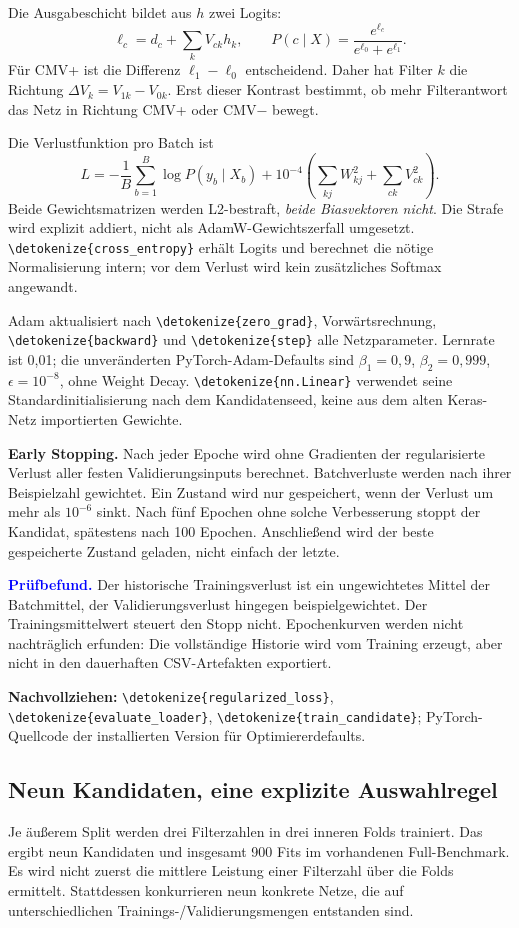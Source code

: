 \documentclass[11pt,a4paper]{article}
\newcommand{\code}[1]{\expandafter\nolinkurl\expandafter{\detokenize{#1}}}
\newcommand{\source}[1]{\par{\footnotesize\raggedright\color{muted}\textbf{Nachvollziehen:} #1\par}}
\newcommand{\finding}[1]{\par\smallskip\noindent\textcolor{blue}{\textbf{Prüfbefund.}} #1\par}
\begin{document}
Die Ausgabeschicht bildet aus \(h\) zwei Logits:
\[
 \ell_c=d_c+\sum_k V_{ck}h_k,\qquad
 P(c\mid X)=\frac{e^{\ell_c}}{e^{\ell_0}+e^{\ell_1}}.
\]
Für CMV+ ist die Differenz \(\ell_1-\ell_0\) entscheidend. Daher hat
Filter \(k\) die Richtung \(\Delta V_k=V_{1k}-V_{0k}\). Erst dieser
Kontrast bestimmt, ob mehr Filterantwort das Netz in Richtung CMV+ oder
CMV− bewegt.

Die Verlustfunktion pro Batch ist
\[
 L=-\frac1B\sum_{b=1}^B\log P(y_b\mid X_b)
   +10^{-4}\left(\sum_{kj}W_{kj}^2+\sum_{ck}V_{ck}^2\right).
\]
Beide Gewichtsmatrizen werden L2-bestraft, \emph{beide Biasvektoren nicht}.
Die Strafe wird explizit addiert, nicht als AdamW-Gewichtszerfall umgesetzt.
\code{cross_entropy} erhält Logits und berechnet die nötige Normalisierung
intern; vor dem Verlust wird kein zusätzliches Softmax angewandt.

Adam aktualisiert nach \code{zero_grad}, Vorwärtsrechnung,
\code{backward} und \code{step} alle Netzparameter. Lernrate ist 0,01;
die unveränderten PyTorch-Adam-Defaults sind \(\beta_1=0{,}9\),
\(\beta_2=0{,}999\), \(\epsilon=10^{-8}\), ohne Weight Decay.
\code{nn.Linear} verwendet seine Standardinitialisierung nach dem
Kandidatenseed, keine aus dem alten Keras-Netz importierten Gewichte.

\textbf{Early Stopping.} Nach jeder Epoche wird ohne Gradienten der
regularisierte Verlust aller festen Validierungsinputs berechnet.
Batchverluste werden nach ihrer Beispielzahl gewichtet. Ein Zustand wird
nur gespeichert, wenn der Verlust um mehr als \(10^{-6}\) sinkt.
Nach fünf Epochen ohne solche Verbesserung stoppt der Kandidat, spätestens
nach 100 Epochen. Anschließend wird der beste gespeicherte Zustand geladen,
nicht einfach der letzte.

\finding{Der historische Trainingsverlust ist ein ungewichtetes Mittel der
Batchmittel, der Validierungsverlust hingegen beispielgewichtet. Der
Trainingsmittelwert steuert den Stopp nicht. Epochenkurven werden nicht
nachträglich erfunden: Die vollständige Historie wird vom Training erzeugt,
aber nicht in den dauerhaften CSV-Artefakten exportiert.}
\source{\code{regularized_loss}, \code{evaluate_loader}, \code{train_candidate};
PyTorch-Quellcode der installierten Version für Optimiererdefaults.}

\clearpage
\subsection*{Neun Kandidaten, eine explizite Auswahlregel}
Je äußerem Split werden drei Filterzahlen in drei inneren Folds trainiert.
Das ergibt neun Kandidaten und insgesamt 900 Fits im vorhandenen
Full-Benchmark. Es wird nicht zuerst die mittlere Leistung einer Filterzahl
über die Folds ermittelt. Stattdessen konkurrieren neun konkrete Netze,
die auf unterschiedlichen Trainings-/Validierungsmengen entstanden sind.
\end{document}
